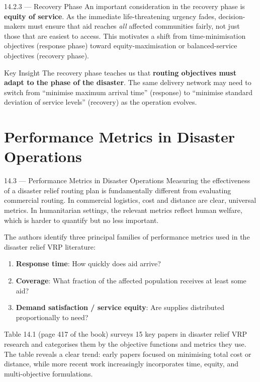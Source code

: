 \documentclass[aspectratio=169,10pt]{beamer}
\begin{document}
\begin{frame}[allowframebreaks]{14.2.3 --- Recovery Phase}
  \medskip
  An important consideration in the recovery phase is
  \textbf{equity of service}.
  As the immediate life-threatening urgency fades, decision-makers
  must ensure that aid reaches \emph{all} affected communities fairly,
  not just those that are easiest to access.
  This motivates a shift from time-minimisation objectives (response phase)
  toward equity-maximisation or balanced-service objectives (recovery phase).

  \begin{alertblock}{Key Insight}
    The recovery phase teaches us that \textbf{routing objectives must
    adapt to the phase of the disaster}.
    The same delivery network may need to switch from
    ``minimise maximum arrival time'' (response) to
    ``minimise standard deviation of service levels'' (recovery)
    as the operation evolves.
  \end{alertblock}
\end{frame}

\section{Performance Metrics in Disaster Operations}

\begin{frame}[allowframebreaks]{14.3 --- Performance Metrics in Disaster Operations}
  Measuring the effectiveness of a disaster relief routing plan is
  fundamentally different from evaluating commercial routing.
  In commercial logistics, cost and distance are clear, universal metrics.
  In humanitarian settings, the relevant metrics reflect human welfare,
  which is harder to quantify but no less important.

  \medskip
  The authors identify three principal families of performance metrics
  used in the disaster relief VRP literature:
  \begin{enumerate}
    \item \textbf{Response time}: How quickly does aid arrive?
    \item \textbf{Coverage}: What fraction of the affected population
          receives at least some aid?
    \item \textbf{Demand satisfaction / service equity}: Are supplies
          distributed proportionally to need?
  \end{enumerate}

  \medskip
  Table 14.1 (page 417 of the book) surveys 15 key papers in disaster
  relief VRP research and categorises them by the objective functions
  and metrics they use.
  The table reveals a clear trend: early papers focused on minimising
  total cost or distance, while more recent work increasingly incorporates
  time, equity, and multi-objective formulations.
\end{frame}
\end{document}

